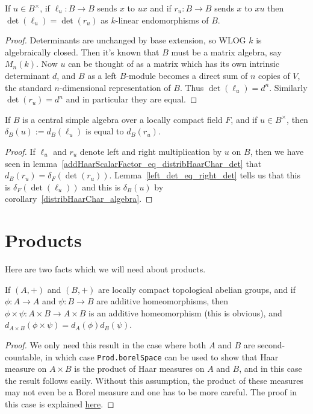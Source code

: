 \begin{lemma}
  \label{left_det_eq_right_det}
  If $u\in B^\times$, if $\ell_u:B\to B$ sends $x$ to $ux$ and if $r_u:B\to B$
  sends $x$ to $xu$ then $\det(\ell_u)=\det(r_u)$ as $k$-linear endomorphisms of $B$.
\end{lemma}
\begin{proof}
  Determinants are unchanged by base extension, so WLOG $k$ is algebraically closed.
  Then it's known that $B$ must be a matrix algebra, say $M_n(k)$. Now $u$ can be thought
  of as a matrix which has its own intrinsic determinant $d$, and $B$ as a left $B$-module
  becomes a direct sum of $n$ copies of $V$, the standard $n$-dimensional representation of $B$.
  Thus $\det(\ell_u)=d^n$. Similarly $\det(r_u)=d^n$ and in particular they are equal.
\end{proof}

\begin{corollary}
  \label{distribHaarChar_eq_addHaarScalarFactor_right_of_isCentralSimple}
  If $B$ is a central simple algebra over a locally compact field $F$, and if $u\in B^\times$,
  then $\delta_B(u):=d_B(\ell_u)$ is equal to $d_B(r_u)$.
\end{corollary}
\begin{proof}
  If $\ell_u$ and $r_u$ denote left and right multiplication by $u$ on $B$, then we have
  seen in lemma~\ref{addHaarScalarFactor_eq_distribHaarChar_det} that $d_B(r_u)=\delta_F(\det(r_u))$.
  Lemma~\ref{left_det_eq_right_det} tells
  us that this is $\delta_F(\det(\ell_u))$ and this is $\delta_B(u)$ by
  corollary~\ref{distribHaarChar_algebra}.
\end{proof}

\section{Products}

Here are two facts which we will need about products.

\begin{lemma}
  \label{addHaarScalarFactor_prod}
  If $(A,+)$ and $(B,+)$ are locally compact topological abelian groups,
  and if $\phi:A\to A$ and $\psi:B\to B$ are additive homeomorphisms,
  then $\phi\times\psi:A\times B\to A\times B$ is an additive homeomorphism (this is
  obvious), and
  $d_{A\times B}(\phi\times\psi)=d_A(\phi)d_B(\psi)$.
\end{lemma}
\begin{proof}
  We only need this result in the case where both $A$ and $B$ are second-countable, in which case
  {\tt Prod.borelSpace} can be used to show that Haar measure on $A\times B$ is the product of
  Haar measures on $A$ and $B$, and in this case the result follows easily. Without this assumption,
  the product of these measures may not even be a Borel measure and one has to be more careful.
  The proof in this case is explained \href{https://leanprover.zulipchat.com/#narrow/channel/116395-maths/topic/Product.20of.20Borel.20spaces/near/487257981}{here}.
\end{proof}

